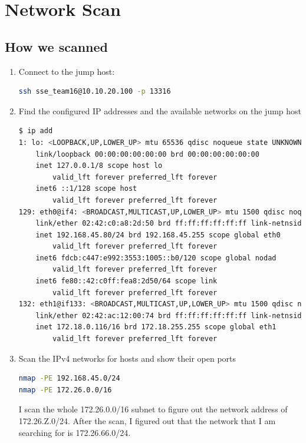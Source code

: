 \section{Network Scan}

\subsection{How we scanned}
\begin{enumerate}
    \item Connect to the jump host:
    \begin{lstlisting}[language=bash,numbers=none]
ssh sse_team16@10.10.20.100 -p 13316
    \end{lstlisting}

    \item Find the configured IP addresses and the available networks on the jump host
    \begin{lstlisting}[language=bash,numbers=none]
$ ip add
1: lo: <LOOPBACK,UP,LOWER_UP> mtu 65536 qdisc noqueue state UNKNOWN group default qlen 1000
    link/loopback 00:00:00:00:00:00 brd 00:00:00:00:00:00
    inet 127.0.0.1/8 scope host lo
        valid_lft forever preferred_lft forever
    inet6 ::1/128 scope host
        valid_lft forever preferred_lft forever
129: eth0@if4: <BROADCAST,MULTICAST,UP,LOWER_UP> mtu 1500 qdisc noqueue state UP group default
    link/ether 02:42:c0:a8:2d:50 brd ff:ff:ff:ff:ff:ff link-netnsid 0
    inet 192.168.45.80/24 brd 192.168.45.255 scope global eth0
        valid_lft forever preferred_lft forever
    inet6 fdcb:c447:e992:3553:1005::b0/120 scope global nodad
        valid_lft forever preferred_lft forever
    inet6 fe80::42:c0ff:fea8:2d50/64 scope link
        valid_lft forever preferred_lft forever
132: eth1@if133: <BROADCAST,MULTICAST,UP,LOWER_UP> mtu 1500 qdisc noqueue state UP group default
    link/ether 02:42:ac:12:00:74 brd ff:ff:ff:ff:ff:ff link-netnsid 0
    inet 172.18.0.116/16 brd 172.18.255.255 scope global eth1
        valid_lft forever preferred_lft forever
    \end{lstlisting}

    \item Scan the IPv4 networks for hosts and show their open ports
    \begin{lstlisting}[language=bash,numbers=none]
nmap -PE 192.168.45.0/24
nmap -PE 172.26.0.0/16
    \end{lstlisting}
    I scan the whole 172.26.0.0/16 subnet to figure out the network address of 172.26.Z.0/24.
    After the scan, I figured out that the network that I am searching for is 172.26.66.0/24.


\end{enumerate}
